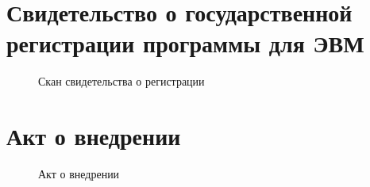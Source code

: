 \chapter{Свидетельство о государственной регистрации программы для ЭВМ}\label{ch:app1}


\begin{center}
    \begin{figure}[hb]
        \caption{Скан свидетельства о регистрации}\label{app:fig:registration}
    \end{figure}
\end{center}
    


\chapter{Акт о внедрении}\label{ch:app2}

\begin{center}
    \begin{figure}[hb]
        \caption{Акт о внедрении}\label{app:fig:implementation}
    \end{figure}
\end{center}
